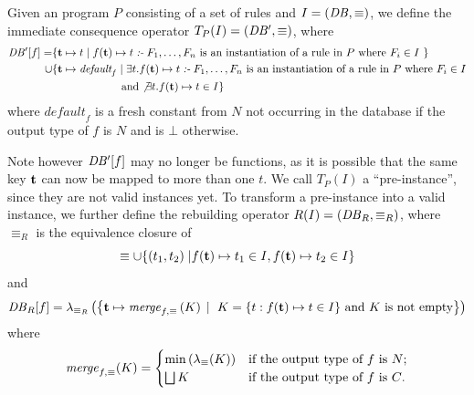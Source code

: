 Given an \egglog program $P$ 
 consisting of a set of rules and $I=(\mathit{DB}{}, \equiv)$, 
 we define the immediate consequence operator $T_P(I)=(\mathit{DB}{}', \equiv)$, where
\begin{align*}
    \mathit{DB}{}'[f]=&\{ \textbf{t}{}\mapsto t\;|\;f(\textbf{t}{})\mapsto t\;\textit{:-}\;F_1,\ldots,F_n \text{ is an instantiation of a rule in $P$ where $F_i\in I$ } \}\\
    \cup& \{ \textbf{t}{}\mapsto \textit{default}_f\;|\;\exists t.f(\textbf{t}{})\mapsto t\;\textit{:-}\;F_1,\ldots,F_n \text{ is an instantiation of a rule in $P$ where $F_i\in I$}\\
    &\text{\quad\quad\quad\quad\quad\quad\  and $\not \exists t. f(\textbf{t}{})\mapsto t\in I$\} } 
\end{align*}
where $\textit{default}_f$ is a fresh constant from $N$ not occurring in the database if the output type of $f$ is $N$ and is $\bot$ otherwise.

Note however $\mathit{DB}{}'[f]$ may no longer be functions, 
 as it is possible that the same key $\textbf{t}{}$ can now be mapped to more than one $t$.
We call $T_P(I)$ a ``pre-instance'', since they are not valid instances yet.
To transform a pre-instance into a valid instance, 
 we further define the rebuilding operator \(
    R(I) = (\mathit{DB}{}_R, \equiv_R)
\), 
where $\equiv_R$ is the equivalence closure of 
\[
    \equiv\cup 
    \{(t_1,t_2)\;|f(\textbf{t}{})\mapsto t_1\in I, 
    f(\textbf{t}{})\mapsto t_2\in I\}
\]
and
\[
    \mathit{DB}{}_R[f]=\lambda_{\equiv_R}\left(\left\{
    \textbf{t}\mapsto 
    \mathit{merge}_{f,\equiv}\left(
        K
    \right)\;|\; 
    \text{ $K=\left\{t: f(\textbf{t})\mapsto t\in I\right\}$ and $K$ is not empty}
    \right\}\right)
\]
where \[
    \mathit{merge}_{f,\equiv}(K)=
    \begin{cases}
        \min\left(\lambda_{\equiv}(K)\right) &\text{if the output type of $f$ is $N$;}\\
        \bigsqcup K &\text{if the output type of $f$ is $C$.}
    \end{cases}
\]

\def\lfp{\mathit{lfp}}

